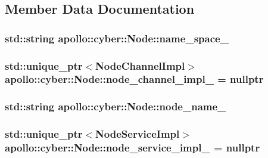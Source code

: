 \subsection{Member Data Documentation}
\hypertarget{classapollo_1_1cyber_1_1Node_ad7fbce28b454e6f419cbae9c9e55f665}{
\subsubsection[{name\-\_\-space\-\_\-}]{\setlength{\rightskip}{0pt plus 5cm}std\-::string apollo\-::cyber\-::\-Node\-::name\-\_\-space\-\_\-\hspace{0.3cm}{\ttfamily [private]}}}\label{classapollo_1_1cyber_1_1Node_ad7fbce28b454e6f419cbae9c9e55f665}
\hypertarget{classapollo_1_1cyber_1_1Node_aca5b98e6450b2c8f7a399f25e128fc70}{
\subsubsection[{node\-\_\-channel\-\_\-impl\-\_\-}]{\setlength{\rightskip}{0pt plus 5cm}std\-::unique\-\_\-ptr$<${\bf Node\-Channel\-Impl}$>$ apollo\-::cyber\-::\-Node\-::node\-\_\-channel\-\_\-impl\-\_\- = nullptr\hspace{0.3cm}{\ttfamily [private]}}}\label{classapollo_1_1cyber_1_1Node_aca5b98e6450b2c8f7a399f25e128fc70}
\hypertarget{classapollo_1_1cyber_1_1Node_afc778da4ec0270b109bdc9dd22b435ad}{
\subsubsection[{node\-\_\-name\-\_\-}]{\setlength{\rightskip}{0pt plus 5cm}std\-::string apollo\-::cyber\-::\-Node\-::node\-\_\-name\-\_\-\hspace{0.3cm}{\ttfamily [private]}}}\label{classapollo_1_1cyber_1_1Node_afc778da4ec0270b109bdc9dd22b435ad}
\hypertarget{classapollo_1_1cyber_1_1Node_af99eb9acecc7ee0fc373a94938833579}{
\subsubsection[{node\-\_\-service\-\_\-impl\-\_\-}]{\setlength{\rightskip}{0pt plus 5cm}std\-::unique\-\_\-ptr$<${\bf Node\-Service\-Impl}$>$ apollo\-::cyber\-::\-Node\-::node\-\_\-service\-\_\-impl\-\_\- = nullptr\hspace{0.3cm}{\ttfamily [private]}}}\label{classapollo_1_1cyber_1_1Node_af99eb9acecc7ee0fc373a94938833579}
